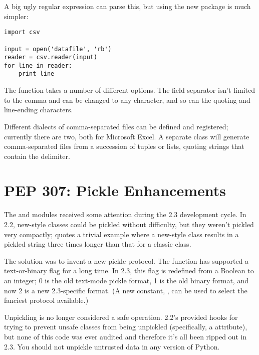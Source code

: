 \documentclass{howto}
\begin{document}
A big ugly regular expression can parse this, but using the new 
 package is much simpler:

\begin{verbatim}
import csv

input = open('datafile', 'rb')
reader = csv.reader(input)
for line in reader:
    print line
\end{verbatim}

The  function takes a number of different options.
The field separator isn't limited to the comma and can be changed to
any character, and so can the quoting and line-ending characters.

Different dialects of comma-separated files can be defined and
registered; currently there are two, both for Microsoft Excel.
A separate  class will generate comma-separated files
from a succession of tuples or lists, quoting strings that contain the
delimiter.  

\begin{seealso}


\end{seealso}

\section{PEP 307: Pickle Enhancements \label{section-pep305}}

The  and  modules received some
attention during the 2.3 development cycle.  In 2.2, new-style classes
could be pickled without difficulty, but they weren't pickled very
compactly;  quotes a trivial example where a new-style class
results in a pickled string three times longer than that for a classic
class.

The solution was to invent a new pickle protocol.  The
 function has supported a text-or-binary flag 
for a long time.  In 2.3, this flag is redefined from a Boolean to an
integer; 0 is the old text-mode pickle format, 1 is the old binary
format, and now 2 is a new 2.3-specific format.  (A new constant,
, can be used to select the fanciest
protocol available.)

Unpickling is no longer considered a safe operation.  2.2's
 provided hooks for trying to prevent unsafe classes
from being unpickled (specifically, a
 attribute), but none of this code
was ever audited and therefore it's all been ripped out in 2.3.  You
should not unpickle untrusted data in any version of Python.
\end{document}
